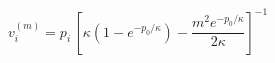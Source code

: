 \begin{equation}\label{20b}
 v_i^{(m)} = p_i\, \left[\kappa\left(1-e^{-p_0/\kappa}\right) - \frac{m^2e^{-p_0/\kappa}}{2\kappa}\right]^{-1}
\end{equation}

